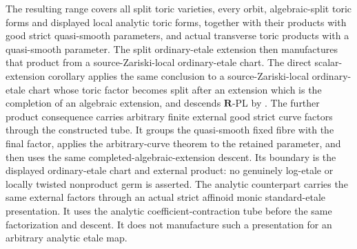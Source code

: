 The resulting range covers all split toric varieties, every orbit,
algebraic-split toric forms and displayed local analytic toric forms, together
with their products with good strict quasi-smooth parameters, and
actual transverse toric products with a quasi-smooth parameter.  The split
ordinary-etale extension
then manufactures that product from a source-Zariski-local ordinary-etale
chart.  The direct scalar-extension corollary
 applies the same
conclusion to a source-Zariski-local ordinary-etale chart whose toric factor
becomes split after an extension which is the completion of an algebraic
extension, and descends
\(\mathbf R\)-PL by \cite[Corollary~5.12]{GJR26}.
The further product consequence
 carries arbitrary
finite external good strict curve factors through the constructed tube.  It
groups the quasi-smooth fixed fibre with the final factor, applies the
arbitrary-curve theorem to the retained parameter, and then uses the same
completed-algebraic-extension descent.  Its boundary is the displayed
ordinary-etale chart and external product: no genuinely log-etale or locally
twisted nonproduct germ is asserted.
The analytic counterpart
carries the same external factors through an actual strict affinoid monic
standard-etale presentation.  It uses the analytic coefficient-contraction
tube before the same factorization and descent.  It does not manufacture
such a presentation for an arbitrary analytic etale map.

